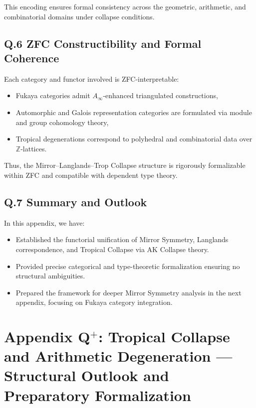 \documentclass[11pt]{article}
\begin{document}
This encoding ensures formal consistency across the geometric, arithmetic, and combinatorial domains under collapse conditions.


\subsection*{Q.6 ZFC Constructibility and Formal Coherence}

Each category and functor involved is ZFC-interpretable:

\begin{itemize}
  \item Fukaya categories admit $A_\infty$-enhanced triangulated constructions,
  \item Automorphic and Galois representation categories are formulated via module and group cohomology theory,
  \item Tropical degenerations correspond to polyhedral and combinatorial data over $\mathbb{Z}$-lattices.
\end{itemize}

Thus, the Mirror–Langlands–Trop Collapse structure is rigorously formalizable within ZFC and compatible with dependent type theory.

\subsection*{Q.7 Summary and Outlook}

In this appendix, we have:

\begin{itemize}
  \item Established the functorial unification of Mirror Symmetry, Langlands correspondence, and Tropical Collapse via AK Collapse theory.
  \item Provided precise categorical and type-theoretic formalization ensuring no structural ambiguities.
  \item Prepared the framework for deeper Mirror Symmetry analysis in the next appendix, focusing on Fukaya category integration.
\end{itemize}




\section*{Appendix Q$^{+}$: Tropical Collapse and Arithmetic Degeneration — Structural Outlook and Preparatory Formalization}
\end{document}
